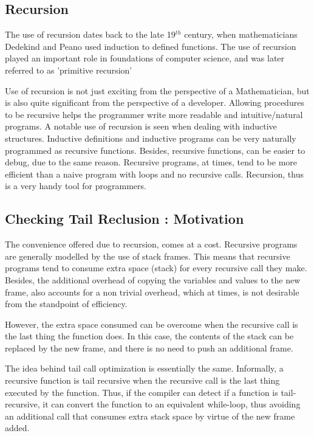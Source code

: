\subsection{Recursion}
\hspace{0.2in} 
The use of recursion dates back to the late 19$^{th}$ century, when mathematicians Dedekind and Peano used induction to defined functions.
The use of recursion played an important role in foundations of computer science, and was later referred to as 'primitive recursion'~\cite{Soare96}

Use of recursion is not just exciting from the perspective of a Mathematician, but is also quite significant from the perspective of a developer.
Allowing procedures to be recursive helps the programmer write more readable and intuitive/natural programs.
A notable use of recursion is seen when dealing with inductive structures.
Inductive definitions and inductive programs can be very naturally programmed as recursive functions.
Besides, recursive functions, can be easier to debug, due to the same reason.
Recursive programs, at times, tend to be more efficient than a naive program with loops and no recursive calls. 
Recursion, thus is a very handy tool for programmers.

\subsection{Checking Tail Reclusion : Motivation}

\hspace{0.2in} The convenience offered due to recursion, comes at a cost. 
Recursive programs are generally modelled by the use of stack frames. 
This means that recursive programs tend to consume extra space (stack) for every recursive call they make.
Besides, the additional overhead of copying the variables and values to the new frame, also accounts for a non trivial overhead, which at times, is not desirable from the standpoint of efficiency.

However, the extra space consumed can be overcome when the recursive call is the last thing the function does. 
In this case, the contents of the stack can be replaced by the new frame, and there is no need to push an additional frame.

The idea behind tail call optimization is essentially the same. 
Informally, a recursive function is tail recursive when the recursive call is the last thing executed by the function. 
Thus, if the compiler can detect if a function is tail-recursive, it can convert the function to an equivalent while-loop, thus avoiding an additional call that consumes extra stack space by virtue of the new frame added.

